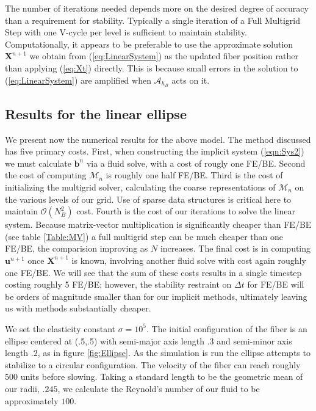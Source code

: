 \documentclass[preprint,12pt]{elsarticle}
\begin{document}
The number of iterations needed depends more on the desired degree of accuracy than a requirement for stability. Typically a single iteration of a Full Multigrid Step with one V-cycle per level is sufficient to maintain stability. 
Computationally, it appears to be preferable to use the approximate solution $\mathbf{X}^{n+1}$ we obtain from (\ref{eq:LinearSystem}) as the updated fiber position rather than applying (\ref{eq:Xt}) directly. This is because small errors in the solution to (\ref{eq:LinearSystem}) are amplified when $\mathcal{A}_{h_B}$ acts on it. 



\subsection{Results for the linear ellipse}
We present now the numerical results for the above model.
The method discussed has five primary costs. First, when constructing the implicit system (\ref{eqn:Sys2}) we must calculate $\mathbf{b}^n$ via a fluid solve, with a cost of rougly one FE/BE. Second the cost of computing $\mathcal{M}_n$ is roughly one half FE/BE. Third is the cost of initializing the multigrid solver, calculating the coarse representations of $\mathcal{M}_n$ on the various levels of our grid. Use of sparse data structures is critical here to maintain $\mathcal{O}(N_B^2)$ cost. Fourth is the cost of our iterations to solve the linear system. Because matrix-vector multiplication is significantly cheaper than FE/BE (see table \ref{Table:MV}) a full multigrid step can be much cheaper than one FE/BE, the comparision improving as $N$ increases.
The final cost is in computing $\mathbf{u}^{n+1}$ once $\mathbf{X}^{n+1}$ is known, involving another fluid solve with cost again roughly one FE/BE. We will see that the sum of these costs results in a single timestep costing roughly 5 FE/BE; however, the stability restraint on $\Delta t$ for FE/BE will be orders of magnitude smaller than for our implicit methods, ultimately leaving us with methods substantially cheaper.

We set the elasticity constant $\sigma=10^5$. The initial configuration of the fiber is an ellipse centered at (.5,.5) with semi-major axis length $.3$ and semi-minor axis length $.2$, as in figure \ref{fig:Ellipse}. As the simulation is run the ellipse attempts to stabilize to a circular configuration. The velocity of the fiber can reach roughly $500$ units before slowing. Taking a standard length to be the geometric mean of our radii, $.245$, we calculate the Reynold's number of our fluid to be approximately $100$.
\end{document}
